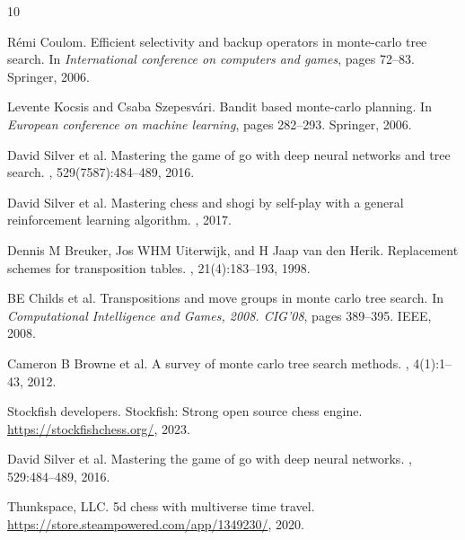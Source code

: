 \documentclass{article}
\begin{document}
\begin{thebibliography}{10}

Rémi Coulom.
\newblock Efficient selectivity and backup operators in monte-carlo tree search.
\newblock In {\em International conference on computers and games}, pages 72--83. Springer, 2006.

Levente Kocsis and Csaba Szepesvári.
\newblock Bandit based monte-carlo planning.
\newblock In {\em European conference on machine learning}, pages 282--293. Springer, 2006.

David Silver et al.
\newblock Mastering the game of go with deep neural networks and tree search.
, 529(7587):484--489, 2016.

David Silver et al.
\newblock Mastering chess and shogi by self-play with a general reinforcement learning algorithm.
, 2017.

Dennis M Breuker, Jos WHM Uiterwijk, and H Jaap van den Herik.
\newblock Replacement schemes for transposition tables.
, 21(4):183--193, 1998.

BE Childs et al.
\newblock Transpositions and move groups in monte carlo tree search.
\newblock In {\em Computational Intelligence and Games, 2008. CIG'08}, pages 389--395. IEEE, 2008.

Cameron B Browne et al.
\newblock A survey of monte carlo tree search methods.
, 4(1):1--43, 2012.

Stockfish developers.
\newblock Stockfish: Strong open source chess engine.
\newblock \url{https://stockfishchess.org/}, 2023.

David Silver et al.
\newblock Mastering the game of go with deep neural networks.
, 529:484--489, 2016.

Thunkspace, LLC.
\newblock 5d chess with multiverse time travel.
\newblock \url{https://store.steampowered.com/app/1349230/}, 2020.

\end{thebibliography}
\end{document}
